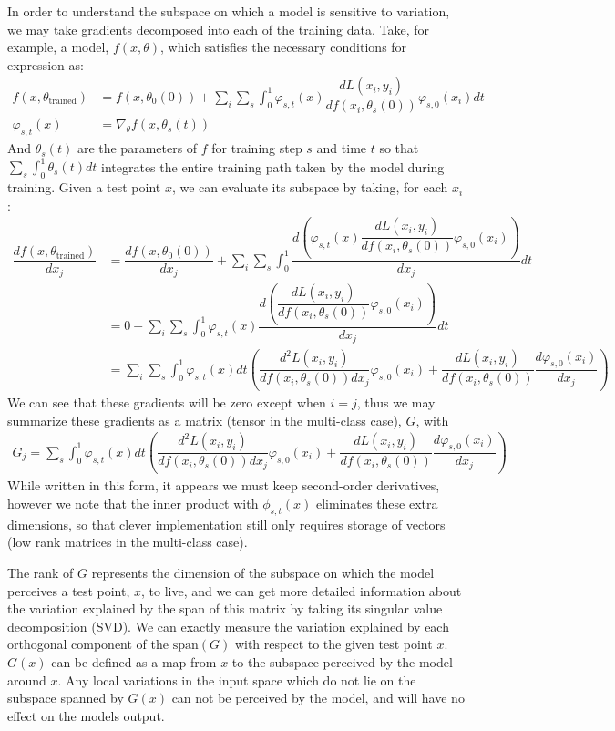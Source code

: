 In order to understand the subspace on which a model is sensitive to variation, we may take gradients decomposed into each of the training data. Take, for example, a model, $f(x, \theta)$, which satisfies the necessary conditions for expression as:
\begin{align}
    f(x, \theta_\text{trained}) &= f(x, \theta_0(0)) + \sum_i \sum_s \int_0^1 \varphi_{s,t}(x) \dfrac{dL(x_i, y_i)}{df(x_i, \theta_s(0))} \varphi_{s, 0}(x_i) dt\\
    \varphi_{s,t}(x) &= \nabla_\theta f(x, \theta_s(t))
\end{align}
And $\theta_s(t)$ are the parameters of $f$ for training step $s$ and time $t$ so that $\sum_s \int_0^1 \theta_s(t) dt$ integrates the entire training path taken by the model during training. Given a test point $x$, we can evaluate its subspace by taking, for each $x_i$:
\begin{align}
    \dfrac{df(x, \theta_\text{trained})}{dx_j} &= \dfrac{df(x, \theta_0(0))}{dx_j} + \sum_i \sum_s \int_0^1 \dfrac{d\left(\varphi_{s,t}(x) \dfrac{dL(x_i, y_i)}{df(x_i, \theta_s(0))} \varphi_{s, 0}(x_i)\right)}{dx_j} dt\\
    &= 0 + \sum_i \sum_s \int_0^1 \varphi_{s,t}(x) \dfrac{d\left(\dfrac{dL(x_i, y_i)}{df(x_i, \theta_s(0))} \varphi_{s, 0}(x_i)\right)}{dx_j} dt \\
    &= \sum_i \sum_s \int_0^1 \varphi_{s,t}(x)dt \left(\dfrac{d^2L(x_i, y_i)}{df(x_i, \theta_s(0)) dx_j} \varphi_{s, 0}(x_i) + \dfrac{dL(x_i, y_i)}{df(x_i, \theta_s(0))} \dfrac{d\varphi_{s, 0}(x_i)}{dx_j}\right) 
\end{align}
We can see that these gradients will be zero except when $i = j$, thus we may summarize these gradients as a matrix (tensor in the multi-class case), $G$, with 
\begin{align}
    G_j = \sum_s \int_0^1 \varphi_{s,t}(x)dt \left(\dfrac{d^2L(x_i, y_i)}{df(x_i, \theta_s(0)) dx_j} \varphi_{s, 0}(x_i) + \dfrac{dL(x_i, y_i)}{df(x_i, \theta_s(0))} \dfrac{d\varphi_{s, 0}(x_i)}{dx_j}\right)
    \label{eq:input_decomp}
\end{align}
While written in this form, it appears we must keep second-order derivatives, however we note that the inner product with $\phi_{s,t}(x)$ eliminates these extra dimensions, so that clever implementation still only requires storage of vectors (low rank matrices in the multi-class case). 

The rank of $G$ represents the dimension of the subspace on which the model perceives a test point, $x$, to live, and we can get more detailed information about the variation explained by the span of this matrix by taking its singular value decomposition (SVD). We can exactly measure the variation explained by each orthogonal component of the $\text{span}(G)$ with respect to the given test point $x$. $G(x)$ can be defined as a map from $x$ to the subspace perceived by the model around $x$. Any local variations in the input space which do not lie on the subspace spanned by $G(x)$ can not be perceived by the model, and will have no effect on the models output.

